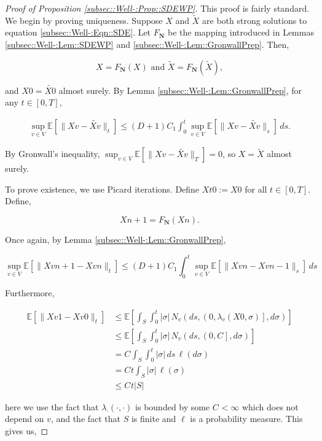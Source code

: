 \documentclass[12pt]{article}
\newcommand{\skipLine}{\vspace{12pt}}
\newcommand{\mb}{\mathbb}
\newcommand{\te}{\text}
\newcommand{\ex}[1]{\mb{E}\left[#1\right]}			%
\newcommand{\defeq}{:=}								%
\renewcommand{\v}{v}							%
\renewcommand{\S}{S}							%
\newcommand{\s}{\sigma}							%
\newcommand{\T}{T}								%
\renewcommand{\t}{t}							%
\renewcommand{\tt}{s}							%
\newcommand{\X}{X}								%
\newcommand{\degr}{D}								%
\newcommand{\poiss}[1]{N_{#1}}						%
\newcommand{\poisses}{\mathbf{N}}				%
\newcommand{\numb}{n}								%
\newcommand{\rate}[1]{\lambda_{#1}}					%
\newcommand{\const}[1]{C_{#1}}						%
\newcommand{\Sm}{\ell}								%
\newcommand{\alt}{\widetilde}						%
\begin{document}
\begin{proof}[Proof of Proposition \ref{subsec::Well-:Prop::SDEWP}]

This proof is fairly standard. We begin by proving uniqueness. Suppose \(\X{}{}\) and \(\alt{\X{}{}}\) are both strong solutions to equation \ref{subsec::Well-:Eqn::SDE}. Let \(F_\poisses\) be the mapping introduced in Lemmas \ref{subsec::Well-:Lem::SDEWP} and \ref{subsec::Well-:Lem::GronwallPrep}. Then,

\[\X{}{} = F_\poisses(\X{}{})\te{ and } \alt{\X{}{}} = F_\poisses(\alt{\X{}{}}),\]

and \(\X{}{0} = \alt{\X{}{0}}\) almost surely. By Lemma \ref{subsec::Well-:Lem::GronwallPrep}, for any \(\t\in [0,\T]\),

\begin{align*}
\sup_{\v\in  V}\ex{\|\X{\v}{} - \alt{\X{\v}{}}\|_\t} \leq (\degr+1)\const{1}\int_0^\t\sup_{\v\in  V} \ex{\|\X{\v}{} - \alt{\X{\v}{}}\|_\tt}\,d\tt.
\end{align*}

By Gronwall's inequality, \(\sup_{\v \in  V} \ex{\|\X{\v}{} - \alt{\X{\v}{}}\|_\T} = 0\), so \(\X{}{} = \alt{\X{}{}}\) almost surely.

\skipLine

To prove existence, we use Picard iterations. Define \(\X{}{\t}{0} \defeq \X{}{0}\) for all \(\t \in [0,\T]\). Define,

\[\X{}{}{\numb+1} = F_\poisses(\X{}{}{\numb}).\]

Once again, by Lemma \ref{subsec::Well-:Lem::GronwallPrep},

\[\sup_{\v \in  V} \ex{\|\X{\v}{}{\numb+1} - \X{\v}{}{\numb}\|_\t} \leq (\degr+1)\const{1} \int_0^\t \sup_{\v \in  V} \ex{\|\X{\v}{}{\numb} - \X{\v}{}{\numb-1}\|_\tt}\,d\tt\] 

Furthermore, 

\begin{align*}
\ex{\|\X{\v}{}{1} - \X{\v}{}{0}\|_\t} &\leq \ex{\int_\S\int_0^\t |\s|\,\poiss{\v}\left(d\tt,\left(0,\rate{\v}(\X{}{0},\s)\right],d\s\right)}\\
&\leq \ex{\int_\S\int_0^\t |\s|\,\poiss{\v}\left(d\tt,\left(0,\const{}\right],d\s\right)}\\
&= \const{}\int_\S\int_0^\t |\s|\,d\tt\,\Sm(d\s)\\
&=\const{}\t\int_\S |\s|\,\Sm(\s)\\
&\leq \const{}\t|\S|
\end{align*}

here we use the fact that \(\rate{\cdot}(\cdot,\cdot)\) is bounded by some \(\const{} < \infty\) which does not depend on \(\v\), and the fact that \(\S\) is finite and \(\Sm\) is a probability measure. This gives us,


\end{proof}
\end{document}
